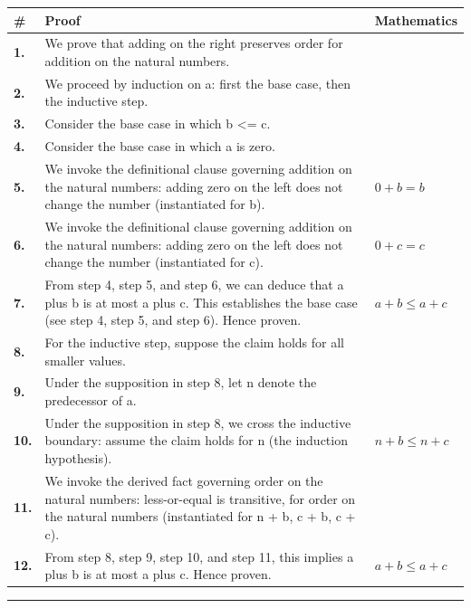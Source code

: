 \documentclass[11pt]{article}
\theoremstyle{definition}
\begin{document}
\begin{tabular}{@{} >{\raggedright\arraybackslash}p{} >{\raggedright\arraybackslash}p{} >{\raggedleft\arraybackslash}p{} @{}}
\textbf{\#} & \textbf{Proof} & \textbf{Mathematics} \\
\midrule
\textbf{1.} & We prove that adding on the right preserves order for addition on the natural numbers. & \\[0.45em]
\textbf{2.} & We proceed by induction on a: first the base case, then the inductive step. & \\[0.45em]
\textbf{3.} & Consider the base case in which b <= c. & \\[0.45em]
\textbf{4.} & Consider the base case in which a is zero. & \\[0.45em]
\textbf{5.} & We invoke the definitional clause governing addition on the natural numbers: adding zero on the left does not change the number (instantiated for b). & $\displaystyle 0 + b = b$ \\[0.45em]
\textbf{6.} & We invoke the definitional clause governing addition on the natural numbers: adding zero on the left does not change the number (instantiated for c). & $\displaystyle 0 + c = c$ \\[0.45em]
\textbf{7.} & From step 4, step 5, and step 6, we can deduce that a plus b is at most a plus c. This establishes the base case (see step 4, step 5, and step 6). Hence proven. & $\displaystyle a + b \le a + c$ \\[0.45em]
\textbf{8.} & For the inductive step, suppose the claim holds for all smaller values. & \\[0.45em]
\textbf{9.} & Under the supposition in step 8, let n denote the predecessor of a. & \\[0.45em]
\textbf{10.} & Under the supposition in step 8, we cross the inductive boundary: assume the claim holds for n (the induction hypothesis). & $\displaystyle n + b \le n + c$ \\[0.45em]
\textbf{11.} & We invoke the derived fact governing order on the natural numbers: less-or-equal is transitive, for order on the natural numbers (instantiated for n + b, c + b, c + c). & \\[0.45em]
\textbf{12.} & From step 8, step 9, step 10, and step 11, this implies a plus b is at most a plus c. Hence proven. & $\displaystyle a + b \le a + c$ \\[0.45em]
\bottomrule
\end{tabular}
\label{thm:Nat-addition-adding_on_the_right_preserves_order}
\par\medskip\hrule
\end{document}
